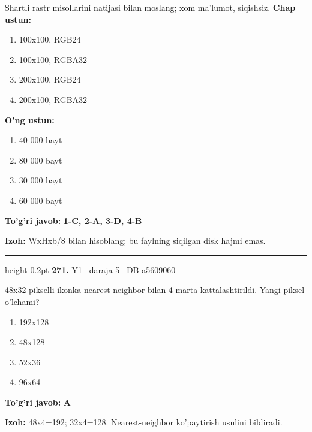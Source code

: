 \documentclass[10pt,a4paper,oneside]{article}
\begin{document}
Shartli rastr misollarini natijasi bilan moslang; xom ma'lumot, siqishsiz.
\textbf{\footnotesize Chap ustun:}
\begin{enumerate}[label=\arabic*),leftmargin=9mm]
\item 100x100, RGB24
\item 100x100, RGBA32
\item 200x100, RGB24
\item 200x100, RGBA32
\end{enumerate}
\textbf{\footnotesize O'ng ustun:}
\begin{enumerate}[label=\Alph*),leftmargin=9mm]
\item 40 000 bayt
\item 80 000 bayt
\item 30 000 bayt
\item 60 000 bayt
\end{enumerate}
\begin{tcolorbox}[enhanced,breakable,colback=teal!4,colframe=teal!45!black,boxrule=0.45pt,arc=1.2mm,left=2.8mm,right=2.8mm,top=2mm,bottom=2mm,before skip=2mm,after skip=2mm]
\textbf{\color{teal}To'g'ri javob:} \textbf{1-C, 2-A, 3-D, 4-B}
\par\smallskip
\textbf{Izoh:} WxHxb/8 bilan hisoblang; bu faylning siqilgan disk hajmi emas.
\end{tcolorbox}
\vspace{2mm}\hrule height 0.2pt \vspace{4mm}
\hypertarget{q271}{\textbf{\color{ink}271.}}  {\color{muted}\scriptsize Y1 \textbullet\ daraja 5 \textbullet\ DB a5609060}
\par
48x32 pikselli ikonka nearest-neighbor bilan 4 marta kattalashtirildi. Yangi piksel o'lchami?
\begin{enumerate}[label=\Alph*),leftmargin=9mm]
\item 192x128
\item 48x128
\item 52x36
\item 96x64
\end{enumerate}
\begin{tcolorbox}[enhanced,breakable,colback=teal!4,colframe=teal!45!black,boxrule=0.45pt,arc=1.2mm,left=2.8mm,right=2.8mm,top=2mm,bottom=2mm,before skip=2mm,after skip=2mm]
\textbf{\color{teal}To'g'ri javob:} \textbf{A}
\par\smallskip
\textbf{Izoh:} 48x4=192; 32x4=128. Nearest-neighbor ko'paytirish usulini bildiradi.
\end{tcolorbox}
\end{document}
